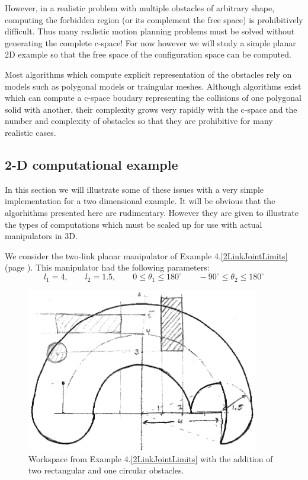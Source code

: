 However, in a realistic problem with multiple obstacles of arbitrary shape, computing the forbidden region (or its complement the free space) is prohibitively difficult.  Thus many realistic motion planning problems must be solved without generating the complete c-space!   For now however we will study a simple planar 2D example so that the free space of the configuration space can be computed.

 Most algorithms which compute explicit representation of the obstacles rely on models such as polygonal models or traingular meshes.   Although  algorithms exist which can compute a c-space boudary representing the collisions of one polygonal solid with another, their complexity grows very rapidly with the c-space and the number and complexity of obstacles so that they are prohibitive for many realistic cases.

\subsection{2-D computational example}
In this section we will illustrate some of these issues with a very simple implementation for a two dimensional example.  It will be obvious that the   algorhithms presented here are rudimentary.  However they are given to illustrate the types of computations which must be scaled up for use with actual manipulators in 3D. 

 We consider the two-link planar manipulator of Example 4.\ref{2LinkJointLimits} (page \pageref{2LinkJointLimits}).  This manipulator had the following parameters:
\[
l_1=4, \qquad l_2=1.5, \qquad 0 \leq \theta_1 \leq 180^\circ \qquad -90^\circ \leq \theta_2 \leq 180^\circ
\]


\begin{figure}\centering
\includegraphics[width=4.0in]{figs08/worksp_obs.eps}
\caption{Workspace from Example 4.\ref{2LinkJointLimits} with the addition of two rectangular and one circular obstacles.}\label{WorkspaceWithObstacles}
\end{figure}

